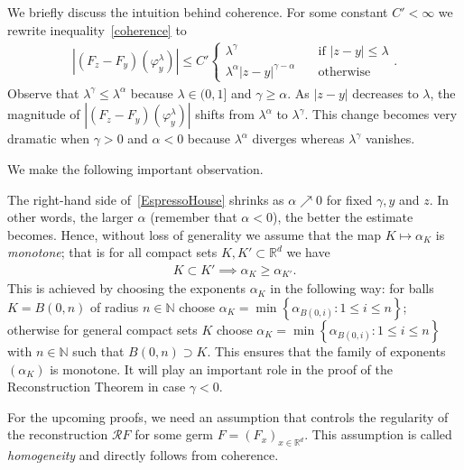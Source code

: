 We briefly discuss the intuition behind coherence. For some constant \( C' < \infty \) we rewrite inequality~\eqref{coherence} to
\begin{align}\label{EspressoHouse}
    |(F_z - F_y)(\varphi^\lambda_y)| \leq C' \begin{cases}
        \lambda^\gamma \quad & \text{if \(|z-y| \leq \lambda\)} \\
        \lambda^{\alpha} |z-y|^{\gamma - \alpha} \quad & \text{otherwise}
    \end{cases}.
\end{align}
Observe that \(\lambda^{\gamma} \leq \lambda^{\alpha}\) because \(\lambda \in (0,1] \) and \(\gamma \geq \alpha\). As \(|z-y|\) decreases to \(\lambda\), the magnitude of \(|(F_z - F_y)(\varphi^\lambda_y)|\) shifts from \(\lambda^\alpha\) to \(\lambda^{\gamma}\). This change becomes very dramatic when \(\gamma > 0\) and \(\alpha < 0\) because \( \lambda^{\alpha} \) diverges whereas \(\lambda^{\gamma}\) vanishes.

We make the following important observation.
\begin{remark}[Monotonicity]
    The right-hand side of~\eqref{EspressoHouse} shrinks as \(\alpha \nearrow 0\) for fixed \(\gamma, y\) and \(z\). In other words, the larger \(\alpha\) (remember that \(\alpha < 0\)), the better the estimate becomes. Hence, without loss of generality we assume that the map \(K \mapsto \alpha_K\) is \emph{monotone}; that is for all compact sets \( K, K' \subset \mathbb{R}^d \) we have
\begin{align}\label{alpha-monotone}
    K \subset K' \implies \alpha_K \geq \alpha_{K'}.
\end{align}
This is achieved by choosing the exponents \(\alpha_K\) in the following way: for balls \(K = B(0,n)\) of radius \(n \in \mathbb{N}\) choose \(\alpha_K = \min\left\{ \alpha_{B(0,i)}  : 1\leq i \leq n\right\}\); otherwise for general compact sets \(K\) choose \(\alpha_K = \min\left\{ \alpha_{B(0,i)}  : 1\leq i \leq n\right\}\) with \(n \in \mathbb{N}\) such that  \(B(0,n) \supset K\). This ensures that the family of exponents \((\alpha_K)\) is monotone. It will play an important role in the proof of the Reconstruction Theorem in case \(\gamma < 0\).
\end{remark}

For the upcoming proofs, we need an assumption that controls the regularity of the reconstruction \( \mathcal{R}F \) for some germ \( F = (F_x)_{x \in \mathbb{R}^d} \). This assumption is called \emph{homogeneity} and directly follows from coherence.

